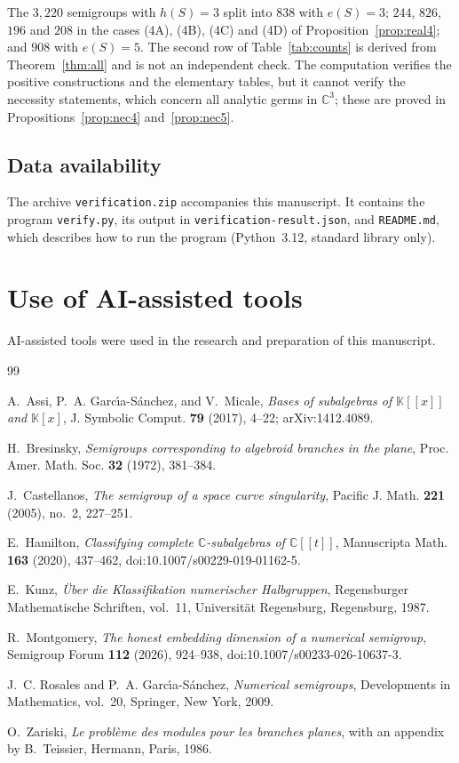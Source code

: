 \documentclass{amsart}
\theoremstyle{definition}
\theoremstyle{remark}
\numberwithin{equation}{section}
\newcommand{\C}{\mathbb{C}}
\begin{document}
The $3{,}220$ semigroups with $h(S)=3$ split into $838$ with $e(S)=3$; $244$, $826$, $196$ and $208$ in the cases (4A), (4B), (4C) and (4D) of Proposition~\ref{prop:real4}; and $908$ with $e(S)=5$. The second row of Table~\ref{tab:counts} is derived from Theorem~\ref{thm:all} and is not an independent check. The computation verifies the positive constructions and the elementary tables, but it cannot verify the necessity statements, which concern all analytic germs in $\C^3$; these are proved in Propositions~\ref{prop:nec4} and~\ref{prop:nec5}.

\subsection*{Data availability}
The archive \texttt{verification.zip} accompanies this manuscript. It contains the program \texttt{verify.py}, its output in \texttt{verification-result.json}, and \texttt{README.md}, which describes how to run the program (Python~3.12, standard library only).

\section*{Use of AI-assisted tools}
AI-assisted tools were used in the research and preparation of this manuscript.

\begin{thebibliography}{99}

A.~Assi, P.~A. Garc\'{\i}a-S\'anchez, and V.~Micale, \emph{Bases of subalgebras of $\mathbb{K}[[x]]$ and $\mathbb{K}[x]$}, J. Symbolic Comput. \textbf{79} (2017), 4--22; arXiv:1412.4089.

H.~Bresinsky, \emph{Semigroups corresponding to algebroid branches in the plane}, Proc. Amer. Math. Soc. \textbf{32} (1972), 381--384.

J.~Castellanos, \emph{The semigroup of a space curve singularity}, Pacific J. Math. \textbf{221} (2005), no.~2, 227--251.

E.~Hamilton, \emph{Classifying complete $\mathbb{C}$-subalgebras of $\mathbb{C}[[t]]$}, Manuscripta Math. \textbf{163} (2020), 437--462, doi:10.1007/s00229-019-01162-5.

E.~Kunz, \emph{\"Uber die Klassifikation numerischer Halbgruppen}, Regensburger Mathematische Schriften, vol.~11, Universit\"at Regensburg, Regensburg, 1987.

R.~Montgomery, \emph{The honest embedding dimension of a numerical semigroup}, Semigroup Forum \textbf{112} (2026), 924--938, doi:10.1007/s00233-026-10637-3.

J.~C. Rosales and P.~A. Garc\'{\i}a-S\'anchez, \emph{Numerical semigroups}, Developments in Mathematics, vol.~20, Springer, New York, 2009.

O.~Zariski, \emph{Le probl\`eme des modules pour les branches planes}, with an appendix by B.~Teissier, Hermann, Paris, 1986.

\end{thebibliography}
\end{document}
